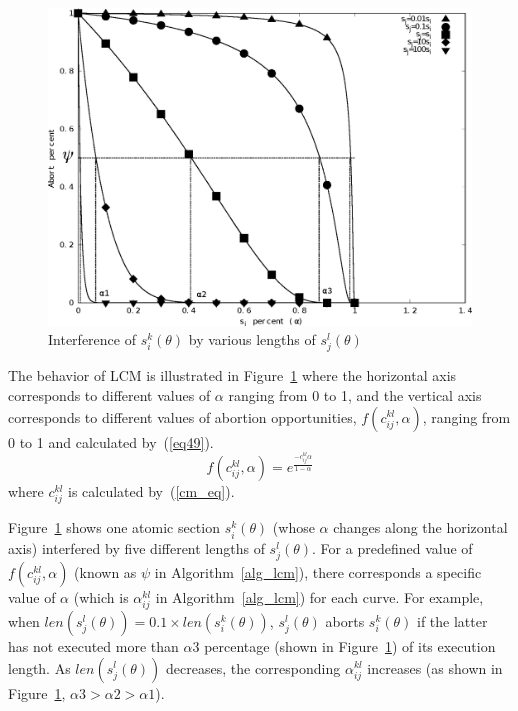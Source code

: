 \documentclass[conference]{sig-alternate}
\begin{document}
%
\begin{figure}[htbp]
\centering
\includegraphics[scale=0.4]{figures/figure16}
\caption{\label{fig16}Interference of $s_{i}^{k}(\theta)$ by various lengths of 
$s_{j}^{l}(\theta)$}
\end{figure}

The behavior of LCM is illustrated in Figure~\ref{fig16} where the horizontal axis corresponds to different values of $\alpha$ ranging from 0 to 1, and the vertical axis corresponds to different values of abortion opportunities, $f(c_{ij}^{kl},\alpha)$, ranging from 0 to 1 and calculated by~(\ref{eq49}).
\begin{equation}
f(c_{ij}^{kl},\alpha)=e^{\frac{-c_{ij}^{kl}\alpha}{1-\alpha}}
\label{eq49}\end{equation}
where $c_{ij}^{kl}$ is calculated by~(\ref{cm_eq}).

Figure~\ref{fig16} shows one atomic section $s_i^k(\theta)$ (whose $\alpha$ changes along the horizontal axis) interfered by five different lengths of $s_j^l(\theta)$.
For a predefined value of $f(c_{ij}^{kl},\alpha)$ (known as $\psi$ in Algorithm~\ref{alg_lcm}), there corresponds a specific value of $\alpha$ (which is $\alpha_{ij}^{kl}$ in Algorithm~\ref{alg_lcm}) for each curve. For example, when $len(s_j^l(\theta))=0.1 \times len(s_i^k(\theta))$, $s_j^l(\theta)$ aborts $s_i^k(\theta)$ if the latter has not executed more than $\alpha3$ percentage (shown in Figure~\ref{fig16}) of its execution length.
As $len(s_{j}^{l}(\theta))$ decreases, the corresponding $\alpha_{ij}^{kl}$ increases (as shown in Figure~\ref{fig16}, $\alpha3>\alpha2>\alpha1$).
\end{document}
